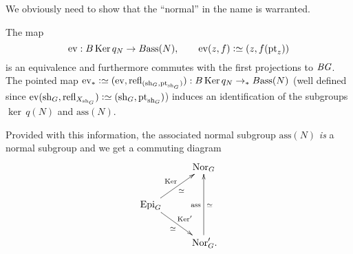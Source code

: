 We obviously need to show that the ``normal'' in the name is warranted.
\begin{lemma}
  \label{lem:normalsarekernels}
The map
$$\mathrm{ev}:B\ker q_N\to B\mathrm{ass}(N),\qquad \mathrm{ev}(z,f)\defequi(z,f(\pt_z))$$ is an equivalence and furthermore commutes with the first projections to $\mathit{B}\mathit{G}$.  The pointed map $\mathrm{ev}_*\defequi(\mathrm{ev},\refl{(\sh_G,\pt_{\sh_G})}):B\ker q_N\to_* B\mathrm{ass}(N)$
(well defined since $\mathrm{ev}(\sh_G,\refl{X_{\sh_G}})\defequi (\sh_G,\pt_{\sh_G})$) induces an identification of the subgroups $\ker\,q(N)$ and $\mathrm{ass}(N)$.  

Provided with this information, the associated normal subgroup $\mathrm{ass}(N)$ \emph{is} a normal subgroup and we get a commuting diagram
$$\xymatrix{&\typenormal_G\\
\typeepi_G\ar[ur]^{\ker}_{\simeq}\ar[dr]^{\ker'}_\simeq&\\
&\,\typenormal_G'.\ar[uu]^{\mathrm{ass}}_\simeq}$$
  
\end{lemma}
